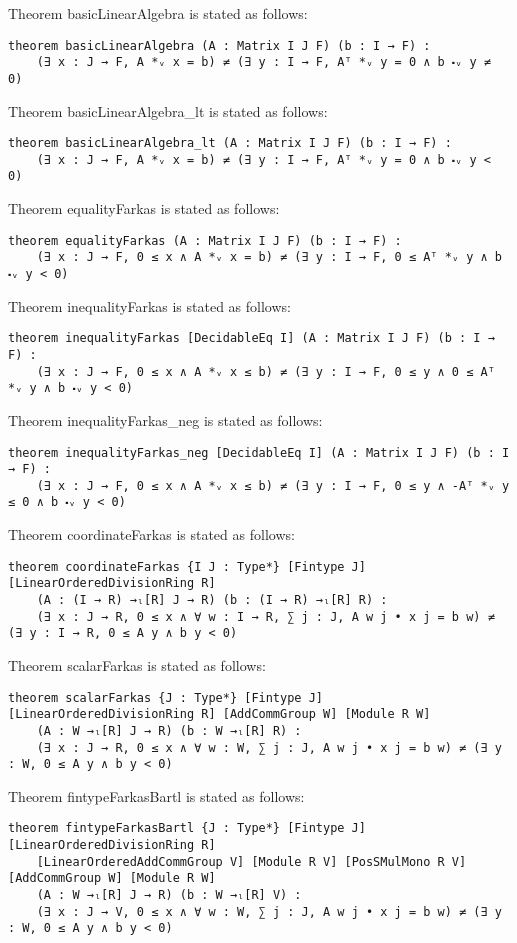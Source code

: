 \documentclass[]{article}
\renewcommand{\.}{\hskip .75pt}
\begin{document}
Theorem basicLinearAlgebra is stated as follows:
\begin{lstlisting}
theorem basicLinearAlgebra (A : Matrix I J F) (b : I → F) :
    (∃ x : J → F, A *ᵥ x = b) ≠ (∃ y : I → F, Aᵀ *ᵥ y = 0 ∧ b ⬝ᵥ y ≠ 0)
\end{lstlisting}
Theorem basicLinearAlgebra\_lt is stated as follows:
\begin{lstlisting}
theorem basicLinearAlgebra_lt (A : Matrix I J F) (b : I → F) :
    (∃ x : J → F, A *ᵥ x = b) ≠ (∃ y : I → F, Aᵀ *ᵥ y = 0 ∧ b ⬝ᵥ y < 0)
\end{lstlisting}
Theorem equalityFarkas is stated as follows:
\begin{lstlisting}
theorem equalityFarkas (A : Matrix I J F) (b : I → F) :
    (∃ x : J → F, 0 ≤ x ∧ A *ᵥ x = b) ≠ (∃ y : I → F, 0 ≤ Aᵀ *ᵥ y ∧ b ⬝ᵥ y < 0)
\end{lstlisting}
Theorem inequalityFarkas is stated as follows:
\begin{lstlisting}
theorem inequalityFarkas [DecidableEq I] (A : Matrix I J F) (b : I → F) :
    (∃ x : J → F, 0 ≤ x ∧ A *ᵥ x ≤ b) ≠ (∃ y : I → F, 0 ≤ y ∧ 0 ≤ Aᵀ *ᵥ y ∧ b ⬝ᵥ y < 0)
\end{lstlisting}
Theorem inequalityFarkas\_neg is stated as follows:
\begin{lstlisting}
theorem inequalityFarkas_neg [DecidableEq I] (A : Matrix I J F) (b : I → F) :
    (∃ x : J → F, 0 ≤ x ∧ A *ᵥ x ≤ b) ≠ (∃ y : I → F, 0 ≤ y ∧ -Aᵀ *ᵥ y ≤ 0 ∧ b ⬝ᵥ y < 0)
\end{lstlisting}
Theorem coordinateFarkas is stated as follows:
\begin{lstlisting}
theorem coordinateFarkas {I J : Type*} [Fintype J] [LinearOrderedDivisionRing R]
    (A : (I → R) →ₗ[R] J → R) (b : (I → R) →ₗ[R] R) :
    (∃ x : J → R, 0 ≤ x ∧ ∀ w : I → R, ∑ j : J, A w j • x j = b w) ≠ (∃ y : I → R, 0 ≤ A y ∧ b y < 0)
\end{lstlisting}
Theorem scalarFarkas is stated as follows:
\begin{lstlisting}
theorem scalarFarkas {J : Type*} [Fintype J] [LinearOrderedDivisionRing R] [AddCommGroup W] [Module R W]
    (A : W →ₗ[R] J → R) (b : W →ₗ[R] R) :
    (∃ x : J → R, 0 ≤ x ∧ ∀ w : W, ∑ j : J, A w j • x j = b w) ≠ (∃ y : W, 0 ≤ A y ∧ b y < 0)
\end{lstlisting}
Theorem fintypeFarkasBartl is stated as follows:
\begin{lstlisting}
theorem fintypeFarkasBartl {J : Type*} [Fintype J] [LinearOrderedDivisionRing R]
    [LinearOrderedAddCommGroup V] [Module R V] [PosSMulMono R V] [AddCommGroup W] [Module R W]
    (A : W →ₗ[R] J → R) (b : W →ₗ[R] V) :
    (∃ x : J → V, 0 ≤ x ∧ ∀ w : W, ∑ j : J, A w j • x j = b w) ≠ (∃ y : W, 0 ≤ A y ∧ b y < 0)
\end{lstlisting}
\end{document}
